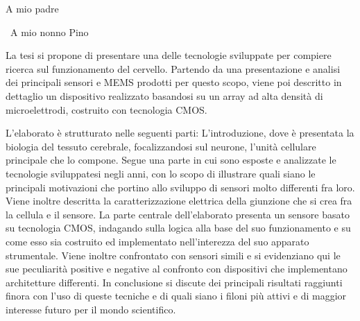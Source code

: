 \documentclass[%
corpo=11 pt,
twoside,
oldstyle,
autoretitolo,
greek,
evenboxes,
]{toptesi}
\begin{document}
	
	
	{\tomo
		\paginavuota
		\begin{dedica}
			A mio padre
			
			\textdagger\ A mio nonno Pino
		\end{dedica}
	}{%
		\frontespizio %
	}
	
	\sommario
	La tesi si propone di presentare una delle tecnologie sviluppate per compiere ricerca sul funzionamento del cervello. Partendo da una presentazione e analisi dei principali sensori e MEMS prodotti per questo scopo, viene poi descritto in dettaglio un dispositivo realizzato basandosi su un array ad alta densità di microelettrodi, costruito con tecnologia CMOS.
	
	L’elaborato è strutturato nelle seguenti parti:
	L’introduzione, dove è presentata la biologia del tessuto cerebrale, focalizzandosi sul neurone, l’unità cellulare principale che lo compone. Segue una parte in cui sono esposte e analizzate le tecnologie sviluppatesi negli anni, con lo scopo di illustrare quali siano le principali motivazioni che portino allo sviluppo di sensori molto differenti fra loro. Viene inoltre descritta la caratterizzazione elettrica della giunzione che si crea fra la cellula e il sensore.  
	La parte centrale dell’elaborato presenta un sensore basato su tecnologia CMOS, indagando sulla logica alla base del suo funzionamento e su come esso sia costruito ed implementato nell’interezza del suo apparato strumentale. Viene inoltre confrontato con sensori simili e si evidenziano qui le sue peculiarità positive e negative al confronto con dispositivi che implementano architetture differenti.
	In conclusione si discute dei principali risultati raggiunti finora con l’uso di queste tecniche e di quali siano i filoni più attivi e di maggior interesse futuro per il mondo scientifico. 
	
\end{document}
